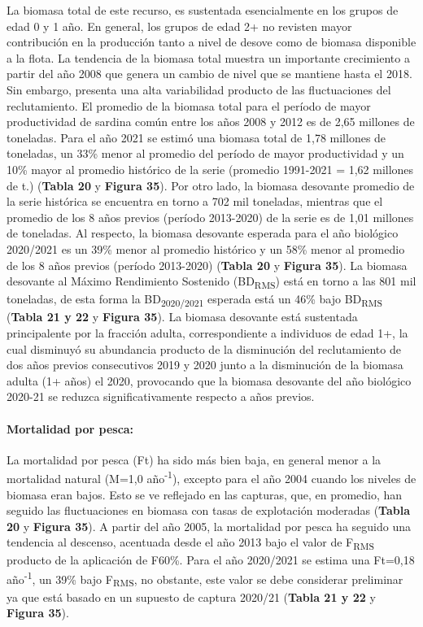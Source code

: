 \documentclass[
  spanish,
]{article}
\begin{document}
La biomasa total de este recurso, es sustentada esencialmente en los
grupos de edad 0 y 1 año. En general, los grupos de edad 2+ no revisten
mayor contribución en la producción tanto a nivel de desove como de
biomasa disponible a la flota. La tendencia de la biomasa total muestra
un importante crecimiento a partir del año 2008 que genera un cambio de
nivel que se mantiene hasta el 2018. Sin embargo, presenta una alta
variabilidad producto de las fluctuaciones del reclutamiento. El
promedio de la biomasa total para el período de mayor productividad de
sardina común entre los años 2008 y 2012 es de 2,65 millones de
toneladas. Para el año 2021 se estimó una biomasa total de 1,78 millones
de toneladas, un 33\% menor al promedio del período de mayor
productividad y un 10\% mayor al promedio histórico de la serie
(promedio 1991-2021 = 1,62 millones de t.) (\textbf{Tabla 20} y
\textbf{Figura 35}). Por otro lado, la biomasa desovante promedio de la
serie histórica se encuentra en torno a 702 mil toneladas, mientras que
el promedio de los 8 años previos (período 2013-2020) de la serie es de
1,01 millones de toneladas. Al respecto, la biomasa desovante esperada
para el año biológico 2020/2021 es un 39\% menor al promedio histórico y
un 58\% menor al promedio de los 8 años previos (período 2013-2020)
(\textbf{Tabla 20} y \textbf{Figura 35}). La biomasa desovante al Máximo
Rendimiento Sostenido (BD\textsubscript{RMS}) está en torno a las 801
mil toneladas, de esta forma la BD\textsubscript{2020/2021} esperada
está un 46\% bajo BD\textsubscript{RMS} (\textbf{Tabla 21 y 22} y
\textbf{Figura 35}). La biomasa desovante está sustentada principalente
por la fracción adulta, correspondiente a individuos de edad 1+, la cual
disminuyó su abundancia producto de la disminución del reclutamiento de
dos años previos consecutivos 2019 y 2020 junto a la disminución de la
biomasa adulta (1+ años) el 2020, provocando que la biomasa desovante
del año biológico 2020-21 se reduzca significativamente respecto a años
previos.

\hypertarget{mortalidad-por-pesca}{%
\paragraph{Mortalidad por pesca:}\label{mortalidad-por-pesca}}

La mortalidad por pesca (Ft) ha sido más bien baja, en general menor a
la mortalidad natural (M=1,0 año\textsuperscript{-1}), excepto para el
año 2004 cuando los niveles de biomasa eran bajos. Esto se ve reflejado
en las capturas, que, en promedio, han seguido las fluctuaciones en
biomasa con tasas de explotación moderadas (\textbf{Tabla 20} y
\textbf{Figura 35}). A partir del año 2005, la mortalidad por pesca ha
seguido una tendencia al descenso, acentuada desde el año 2013 bajo el
valor de F\textsubscript{RMS} producto de la aplicación de F60\%. Para
el año 2020/2021 se estima una Ft=0,18 año\textsuperscript{-1}, un 39\%
bajo F\textsubscript{RMS}, no obstante, este valor se debe considerar
preliminar ya que está basado en un supuesto de captura 2020/21
(\textbf{Tabla 21 y 22} y \textbf{Figura 35}).
\end{document}
